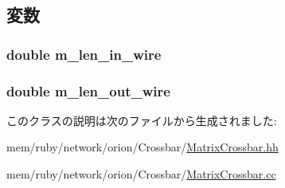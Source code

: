 \subsection{変数}
\hypertarget{classMatrixCrossbar_aff2fda531349c91521ef8a9ae4fdabb7}{
\subsubsection[{m\_\-len\_\-in\_\-wire}]{\setlength{\rightskip}{0pt plus 5cm}double {\bf m\_\-len\_\-in\_\-wire}}}
\label{classMatrixCrossbar_aff2fda531349c91521ef8a9ae4fdabb7}
\hypertarget{classMatrixCrossbar_a401bc9c8a912bebae3e0361bdb4c6235}{
\subsubsection[{m\_\-len\_\-out\_\-wire}]{\setlength{\rightskip}{0pt plus 5cm}double {\bf m\_\-len\_\-out\_\-wire}}}
\label{classMatrixCrossbar_a401bc9c8a912bebae3e0361bdb4c6235}


このクラスの説明は次のファイルから生成されました:\begin{DoxyCompactItemize}
\item 
mem/ruby/network/orion/Crossbar/\hyperlink{MatrixCrossbar_8hh}{MatrixCrossbar.hh}\item 
mem/ruby/network/orion/Crossbar/\hyperlink{MatrixCrossbar_8cc}{MatrixCrossbar.cc}\end{DoxyCompactItemize}
